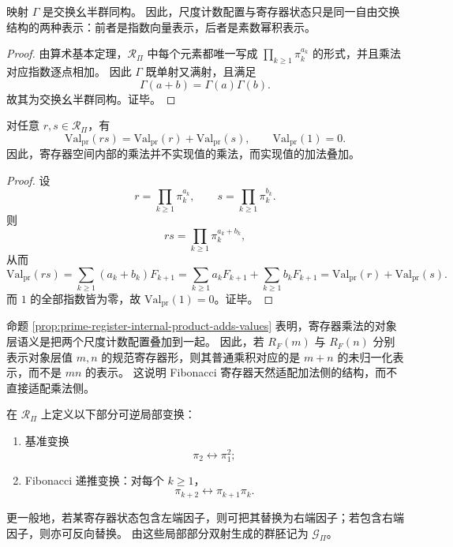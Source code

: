 \begin{proposition}[尺度计数配置与寄存器状态的同构]\label{prop:prime-register-monoid-realization}
映射 \(\Gamma\) 是交换幺半群同构。
因此，尺度计数配置与寄存器状态只是同一自由交换结构的两种表示：前者是指数向量表示，后者是素数幂积表示。
\end{proposition}

\begin{proof}
由算术基本定理，\(\mathcal R_{\Pi}\) 中每个元素都唯一写成 \(\prod_{k\ge1}\pi_k^{a_k}\) 的形式，并且乘法对应指数逐点相加。
因此 \(\Gamma\) 既单射又满射，且满足
\[
\Gamma(a+b)=\Gamma(a)\Gamma(b).
\]
故其为交换幺半群同构。证毕。
\end{proof}

\begin{proposition}[寄存器内部乘法对应值的加法]\label{prop:prime-register-internal-product-adds-values}
对任意 \(r,s\in\mathcal R_{\Pi}\)，有
\[
\mathrm{Val}_{\mathrm{pr}}(rs)=\mathrm{Val}_{\mathrm{pr}}(r)+\mathrm{Val}_{\mathrm{pr}}(s),
\qquad
\mathrm{Val}_{\mathrm{pr}}(1)=0.
\]
因此，寄存器空间内部的乘法并不实现值的乘法，而实现值的加法叠加。
\end{proposition}

\begin{proof}
设
\[
r=\prod_{k\ge1}\pi_k^{a_k},
\qquad
s=\prod_{k\ge1}\pi_k^{b_k}.
\]
则
\[
rs=\prod_{k\ge1}\pi_k^{a_k+b_k},
\]
从而
\[
\mathrm{Val}_{\mathrm{pr}}(rs)
=\sum_{k\ge1}(a_k+b_k)F_{k+1}
=\sum_{k\ge1}a_kF_{k+1}+\sum_{k\ge1}b_kF_{k+1}
=\mathrm{Val}_{\mathrm{pr}}(r)+\mathrm{Val}_{\mathrm{pr}}(s).
\]
而 \(1\) 的全部指数皆为零，故 \(\mathrm{Val}_{\mathrm{pr}}(1)=0\)。证毕。
\end{proof}

\begin{remark}[寄存器内部乘法的对象层语义]\label{rem:prime-register-internal-product-semantics}
命题 \ref{prop:prime-register-internal-product-adds-values} 表明，寄存器乘法的对象层语义是把两个尺度计数配置叠加到一起。
因此，若 \(R_F(m)\) 与 \(R_F(n)\) 分别表示对象层值 \(m,n\) 的规范寄存器形，则其普通乘积对应的是 \(m+n\) 的未归一化表示，而不是 \(mn\) 的表示。
这说明 Fibonacci 寄存器天然适配加法侧的结构，而不直接适配乘法侧。
\end{remark}

\begin{definition}[寄存器上的局部值保持变换]\label{def:prime-register-local-value-preserving-moves}
在 \(\mathcal R_{\Pi}\) 上定义以下部分可逆局部变换：
\begin{enumerate}
  \item 基准变换
  \[
  \pi_2 \longleftrightarrow \pi_1^2;
  \]
  \item Fibonacci 递推变换：对每个 \(k\ge1\)，
  \[
  \pi_{k+2} \longleftrightarrow \pi_{k+1}\pi_k.
  \]
\end{enumerate}
更一般地，若某寄存器状态包含左端因子，则可把其替换为右端因子；若包含右端因子，则亦可反向替换。
由这些局部部分双射生成的群胚记为 \(\mathcal G_{\Pi}\)。
\end{definition}

